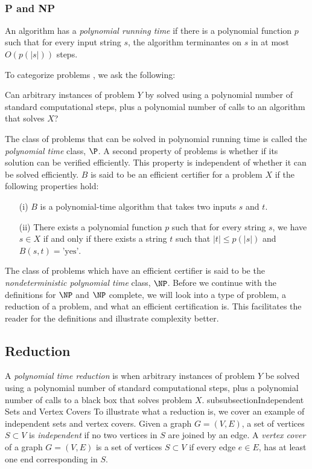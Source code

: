\

\subsubsection{P and NP}

An algorithm has a \textit{polynomial running time} if there is a polynomial function $p$ such that 
for every input string $s$, the algorithm terminantes on $s$ in at most $O\left( p \left( \left\vert 
s \right\vert\right)\right)$ steps.  

To categorize problems \cite{kleinberg2006algorithm}, we ask the following:
\begin{prob}
Can arbitrary instances of problem $Y$ by solved using a polynomial number of standard computational steps, plus a polynomial number of calls to an algorithm that solves $X$?
\end{prob}
The class of problems that can be solved in polynomial running time is called the \textit{polynomial time} class, $\P$.  A second property of problems is whether if its solution can be verified efficiently.  This property is independent of whether it can be solved efficiently.  $B$ is said to be an efficient certifier for a problem $X$  if the following properties hold:
\begin{itemize}
\item[(i)] $B$ is a polynomial-time algorithm that takes two inputs $s$ and $t$.
\item[(ii)] There exists a polynomial function $p$ such that for every string $s$, we have $s \in X$ if and only if there exists a string $t$ such that $\vert t \vert \leq p\left( \vert s \vert \right)$ and $B(s,t) = \text{'yes'}$.
\end{itemize}

The class of problems which have an efficient certifier is said to be the \textit{nondeterministic 
polynomial time} class, $\NP$. Before we continue with the definitions for $\NP$ and $\NP$ 
complete, we will look into a type of problem, a reduction of a problem, and what an efficient 
certification is.  This facilitates the reader for the definitions and illustrate complexity better. 
 
\subsection{Reduction}
A \textit{polynomial time reduction} is when arbitrary instances of problem $Y$ be solved using a polynomial number of standard computational steps, plus a polynomial number of calls to a black box that solves problem $X$.
subsubsection{Independent Sets and Vertex Covers}
To illustrate what a reduction is, we cover an example of independent sets and vertex covers.  
Given a graph $G = (V,E)$, a set of vertices $S \subset V$ is \textit{independent} if no two 
vertices in $S$ are joined by an edge. A \textit{vertex cover} of a graph $G = (V,E)$  is a set of 
vertices $S \subset V$ if every edge $e \in E$, has at least one end corresponding in $S$.

